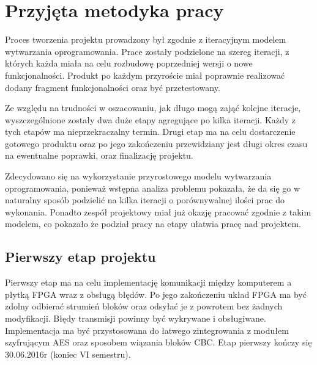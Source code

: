 \section{Przyjęta metodyka pracy}
\label{sec:przyjeta-metodyka-pracy}
Proces tworzenia projektu prowadzony był zgodnie z iteracyjnym modelem wytwarzania oprogramowania. Prace zostały podzielone na szereg iteracji, z których każda miała na celu rozbudowę poprzedniej wersji o nowe funkcjonalności. Produkt po każdym przyroście miał poprawnie realizować dodany fragment funkcjonalności oraz być przetestowany.

Ze względu na trudności w oszacowaniu, jak długo mogą zająć kolejne iteracje, wyszczególnione zostały dwa duże etapy agregujące po kilka iteracji. Każdy z tych etapów ma nieprzekraczalny termin. Drugi etap ma na celu dostarczenie gotowego produktu oraz po jego zakończeniu przewidziany jest długi okres czasu na ewentualne poprawki, oraz finalizację projektu.

Zdecydowano się na wykorzystanie przyrostowego modelu wytwarzania oprogramowania, ponieważ wstępna analiza problemu pokazała, że da się go w naturalny sposób podzielić na kilka iteracji o porównywalnej ilości prac do wykonania. Ponadto zespół projektowy miał już okazję pracować zgodnie z takim modelem, co pokazało że podział pracy na etapy ułatwia pracę nad projektem.

\subsection{Pierwszy etap projektu}
Pierwszy etap ma na celu implementację komunikacji między komputerem a płytką FPGA wraz z obsługą błędów. Po jego zakończeniu układ FPGA ma być zdolny odbierać strumień bloków oraz odsyłać je z powrotem bez żadnych modyfikacji. Błędy transmisji powinny być wykrywane i obsługiwane. Implementacja ma być przystosowana do łatwego zintegrowania z modułem szyfrującym AES oraz sposobem wiązania bloków CBC. Etap pierwszy kończy się 30.06.2016r (koniec VI semestru).

